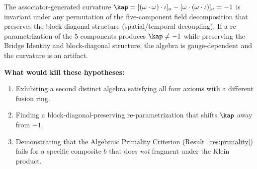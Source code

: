 \begin{hypothesis}\label{hyp:gauge}
The associator-generated curvature $\kap = [(\omega \cdot \omega) \cdot \iota]_a - [\omega \cdot (\omega \cdot \iota)]_a = -1$ is invariant under any permutation of the five-component field decomposition that preserves the block-diagonal structure (spatial/temporal decoupling). If a re-parametrization of the 5 components produces $\kap \neq -1$ while preserving the Bridge Identity and block-diagonal structure, the algebra is gauge-dependent and the curvature is an artifact.
\end{hypothesis}

\textbf{What would kill these hypotheses:}
\begin{enumerate}[noitemsep]
  \item Exhibiting a second distinct algebra satisfying all four axioms with a different fusion ring.
  \item Finding a block-diagonal-preserving re-parametrization that shifts $\kap$ away from $-1$.
  \item Demonstrating that the Algebraic Primality Criterion (Result~\ref{res:primality}) fails for a specific composite $b$ that does \emph{not} fragment under the Klein product.
\end{enumerate}

